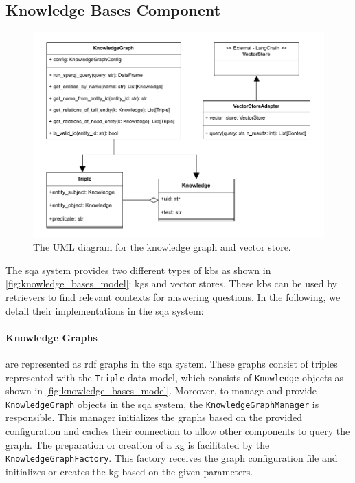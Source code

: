 \subsection{Knowledge Bases Component}
\label{sec:sqas_architecture_knowledge_bases}

\begin{figure}[t]
    \centering
    \includegraphics[width=0.99\linewidth]{figures/framework/figures-Knowledge_bases_uml.drawio.pdf}
    \caption[UML Diagram for KGs and Vector Stores]{The UML diagram for the knowledge graph and vector store.}
    \label{fig:knowledge_bases_model}
\end{figure}

The \gls{sqa} system provides two different types of \glspl{kb} as shown in \autoref{fig:knowledge_bases_model}: \glspl{kg} and vector stores. These \glspl{kb} can be used by retrievers to find relevant contexts for answering questions. In the following, we detail their implementations in the \gls{sqa} system:

\paragraph{Knowledge Graphs} are represented as \gls{rdf} graphs in the \gls{sqa} system. These graphs consist of triples represented with the \texttt{Triple} data model, which consists of \texttt{Knowledge} objects as shown in \autoref{fig:knowledge_bases_model}. Moreover, to manage and provide \texttt{KnowledgeGraph} objects in the \gls{sqa} system, the \texttt{KnowledgeGraphManager} is responsible. This manager initializes the graphs based on the provided configuration and caches their connection to allow other components to query the graph. The preparation or creation of a \gls{kg} is facilitated by the \texttt{KnowledgeGraphFactory}. This factory receives the graph configuration file and initializes or creates the \gls{kg} based on the given parameters.


